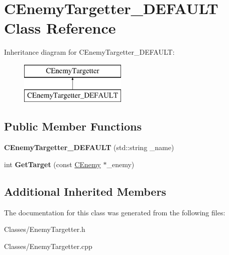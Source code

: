 \hypertarget{class_c_enemy_targetter___d_e_f_a_u_l_t}{}\section{C\+Enemy\+Targetter\+\_\+\+D\+E\+F\+A\+U\+LT Class Reference}
\label{class_c_enemy_targetter___d_e_f_a_u_l_t}
Inheritance diagram for C\+Enemy\+Targetter\+\_\+\+D\+E\+F\+A\+U\+LT\+:\begin{figure}[H]
\begin{center}
\leavevmode
\includegraphics[height=2.000000cm]{class_c_enemy_targetter___d_e_f_a_u_l_t}
\end{center}
\end{figure}
\subsection*{Public Member Functions}
\begin{DoxyCompactItemize}
\item 
{\bfseries C\+Enemy\+Targetter\+\_\+\+D\+E\+F\+A\+U\+LT} (std\+::string \+\_\+name)\hypertarget{class_c_enemy_targetter___d_e_f_a_u_l_t_a09151e2d1fdcafb13695fbdaf4ddb0d6}{}\label{class_c_enemy_targetter___d_e_f_a_u_l_t_a09151e2d1fdcafb13695fbdaf4ddb0d6}

\item 
int {\bfseries Get\+Target} (const \hyperlink{class_c_enemy}{C\+Enemy} $\ast$\+\_\+enemy)\hypertarget{class_c_enemy_targetter___d_e_f_a_u_l_t_a221751274c2f19743d340efded294cd7}{}\label{class_c_enemy_targetter___d_e_f_a_u_l_t_a221751274c2f19743d340efded294cd7}

\end{DoxyCompactItemize}
\subsection*{Additional Inherited Members}


The documentation for this class was generated from the following files\+:\begin{DoxyCompactItemize}
\item 
Classes/Enemy\+Targetter.\+h\item 
Classes/Enemy\+Targetter.\+cpp\end{DoxyCompactItemize}
